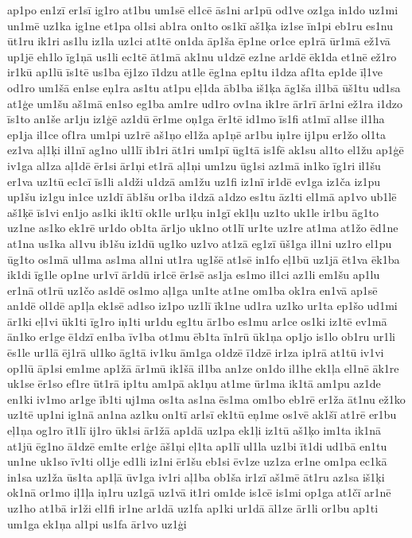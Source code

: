 {ap1po
en1zī
er1sī
ig1ro
at1bu
um1sē
el1cē
ās1ni
ar1pū
od1ve
oz1ga
in1do
uz1mi
un1mē
uz1ka
ig1ne
et1pa
ol1si
ab1ra
on1to
os1kī
aš1ķa
iz1se
īn1pi
eb1ru
es1nu
ūt1ru
ik1ri
as1lu
iz1la
uz1ci
at1tē
on1da
āp1ša
ēp1ne
or1ce
ep1rā
ūr1mā
ež1vā
up1jē
eh1lo
īg1ņā
us1li
ec1tē
āt1mā
ak1nu
u1dzē
ez1ne
ar1dē
ēk1da
et1nē
ež1ro
ir1kū
ap1lū
īs1tē
us1ba
ēj1zo
ī1dzu
at1le
ēg1na
ep1tu
i1dza
af1ta
ep1de
īļ1ve
od1ro
um1šā
en1se
eņ1ra
as1tu
at1pu
eļ1da
āb1ba
iš1ķa
āg1ša
il1bā
ūš1tu
ud1sa
at1ģe
um1šu
aš1mā
en1so
eg1ba
am1re
ud1ro
ov1na
ik1re
ār1rī
ār1ni
ež1ra
i1dzo
īs1to
an1še
ar1ju
iz1ģē
az1dū
ēr1me
oņ1ga
ēr1tē
id1mo
īs1fi
at1mī
al1se
il1ha
ep1ja
il1ce
of1ra
um1pi
uz1rē
aš1ņo
el1ža
ap1ņē
ar1bu
iņ1re
ij1pu
er1žo
ol1ta
ez1va
aļ1ķi
il1nī
ag1no
ul1lī
ib1ri
āt1ri
um1pī
ūg1tā
is1fē
ak1su
al1to
el1žu
ap1ģē
iv1ga
al1za
aļ1dē
ēr1si
ār1ņi
et1rā
aļ1ņi
um1zu
ūg1si
az1mā
in1ko
īg1ri
il1šu
er1va
uz1tū
ec1cī
īs1li
a1dži
u1dzā
am1žu
uz1fi
iz1nī
ir1dē
ev1ga
iz1ča
iz1pu
up1šu
iz1gu
in1ce
uz1dī
āb1šu
or1ba
i1dzā
a1dzo
es1tu
āz1ti
el1mā
ap1vo
ub1lē
aš1ķē
īs1vi
en1jo
as1ki
ik1tī
ok1le
ur1ķu
in1gī
ek1ļu
uz1to
uk1le
ir1bu
āg1to
uz1ne
as1ko
ek1rē
ur1do
ob1ta
ār1jo
uk1no
ot1lī
ur1te
uz1re
at1ma
at1žo
ēd1ne
at1na
us1ka
al1vu
ib1šu
iz1dū
ug1ko
uz1vo
at1zā
eg1zī
ūš1ga
il1ni
uz1ro
el1pu
ūg1to
os1mā
ul1ma
as1ma
al1ni
ut1ra
ug1šē
at1sē
in1fo
eļ1bū
uz1jā
ēt1va
ēk1ba
ik1di
īg1le
op1ne
ur1vī
ār1dū
ir1cē
ēr1sē
as1ja
es1mo
il1ci
az1li
em1šu
ap1lu
er1nā
ot1rū
uz1čo
as1dē
os1mo
aļ1ga
un1te
at1ne
om1ba
ok1ra
en1vā
ap1sē
an1dē
ol1dē
ap1ļa
ek1sē
ad1so
iz1po
uz1lī
īk1ne
ud1ra
uz1ko
ur1ta
ep1šo
ud1mi
ār1ki
eļ1vi
ūk1ti
īg1ro
iņ1ti
ur1du
eg1tu
ār1bo
es1mu
ar1ce
os1ki
iz1tē
ev1mā
ān1ko
er1ge
ē1dzī
en1ba
īv1ba
ot1mu
ēb1ta
īn1rū
ūk1ņa
op1jo
is1lo
ob1ru
ur1li
ēs1le
ur1lā
ēj1rā
ul1ko
āg1tā
iv1ku
ām1ga
o1dzē
ī1dzē
ir1za
ip1rā
at1tū
iv1vi
op1lū
āp1si
em1me
ap1žā
ār1mū
ik1šā
il1ba
an1ze
on1do
il1he
ek1ļa
el1nē
āk1re
uk1se
ēr1so
ef1re
ūt1rā
ip1tu
am1pā
ak1ņu
at1me
ūr1ma
ik1tā
am1pu
az1de
en1ki
iv1mo
ar1ge
īb1ti
uj1ma
os1ta
as1na
ēs1ma
om1bo
eb1rē
er1ža
āt1nu
ež1ko
uz1tē
up1ni
ig1nā
an1na
az1ku
on1tī
ar1sī
ek1tū
eņ1me
os1vē
ak1šī
at1rē
er1bu
eļ1ņa
og1ro
īt1lī
ij1ro
ūk1si
ār1žā
ap1dā
uz1pa
ek1ļi
iz1tū
aš1ķo
im1ta
ik1nā
at1jū
ēg1no
ā1dzē
em1te
er1ģe
āš1ņi
eļ1ta
ap1lī
ul1la
uz1bi
īt1di
ud1bā
en1tu
un1ne
uk1so
īv1ti
ol1je
ed1li
iz1ni
ēr1šu
eb1si
ēv1ze
uz1za
er1ne
om1pa
ec1kā
in1sa
uz1ža
ūs1ta
ap1ļā
ūv1ga
iv1ri
aļ1ba
ob1ša
ir1zī
aš1mē
āt1ru
az1sa
iš1ķi
ok1nā
or1mo
iļ1ļa
iņ1ru
uz1gā
uz1vā
it1ri
om1de
is1cē
is1mi
op1ga
at1čī
ar1nē
uz1ho
at1bā
ir1ži
el1fi
ir1ne
ar1dā
uz1fa
ap1ki
ur1dā
āl1ze
ār1li
or1bu
ap1ti
um1ga
ek1ņa
al1pi
us1fa
ār1vo
uz1ģi
}
